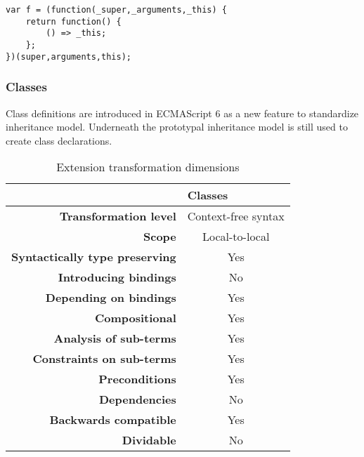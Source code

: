 \documentclass[10pt,a4paper]{article}
\begin{document}
\begin{lstlisting}
var f = (function(_super,_arguments,_this) {
	return function() {	
		() => _this;
	};
})(super,arguments,this);
\end{lstlisting}

\subsubsection{Classes}
Class definitions\cite[14.5]{SpecJS} are introduced in ECMAScript 6 as a new feature to standardize inheritance model. Underneath the prototypal inheritance model is still used to create class declarations.
\begin{table}[h]
\centering
\caption{Extension transformation dimensions}
\label{classes-table}
\begin{tabular}{@{}rc@{}}
\toprule
                                       & \multicolumn{1}{l}{\textbf{Classes}} \\ \midrule
\textbf{Transformation level}          & Context-free syntax                          \\
\textbf{Scope}                         & Local-to-local                               \\
\textbf{Syntactically type preserving} & Yes                                          \\
\textbf{Introducing bindings}          & No                                          \\%
\textbf{Depending on bindings}         & Yes                                           \\
\textbf{Compositional}                 & Yes                                          \\
\textbf{Analysis of sub-terms}          & Yes                                          \\
\textbf{Constraints on sub-terms}       & Yes                                           \\
\textbf{Preconditions}                 & Yes                                          \\
\textbf{Dependencies}                  & No                                           \\
\textbf{Backwards compatible}          & Yes                                          \\
\textbf{Dividable}                     & No                                           \\ \bottomrule
\end{tabular}
\end{table}
\end{document}

